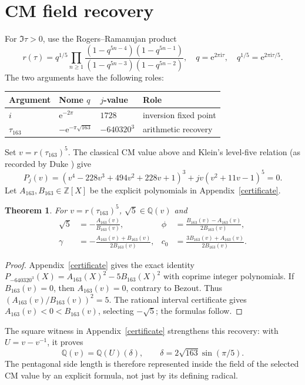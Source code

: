 \documentclass[11pt]{article}
\newtheorem{theorem}{Theorem}[section]\newtheorem{proposition}[theorem]{Proposition}\newtheorem{corollary}[theorem]{Corollary}
\newcommand{\Q}{\mathbb Q}\newcommand{\R}{\mathbb R}\newcommand{\ii}{\mathrm i}\newcommand{\e}{\mathrm e}\newcommand{\Fcal}{\mathcal F}\newcommand{\Tcal}{\mathcal T}
\begin{document}
\section{CM field recovery}\label{sec:cm}
For $\Im\tau>0$, use the Rogers--Ramanujan product
\cite[Eq.~(4.1)]{Duke}
\begin{equation}\label{rr}
r(\tau)=q^{1/5}\prod_{n\ge1}\frac{(1-q^{5n-4})(1-q^{5n-1})}{(1-q^{5n-3})(1-q^{5n-2})},
\quad q=\e^{2\pi\ii\tau},\quad q^{1/5}=\e^{2\pi\ii\tau/5}.
\end{equation}
The two arguments have the following roles:
\begin{center}
\begin{tabular}{@{}llll@{}}
\hline
Argument & Nome $q$ & $j$-value & Role\\ \hline
$i$ & $\e^{-2\pi}$ & $1728$ & inversion fixed point\\
$\tau_{163}$ & $-\e^{-\pi\sqrt{163}}$ & $-640320^3$ & arithmetic recovery\\ \hline
\end{tabular}
\end{center}
Set $v=r(\tau_{163})^5$. The classical CM value above and Klein's
level-five relation (as recorded by Duke \cite[Eq.~(2.5)]{Duke}) give
\begin{equation}\label{klein}
P_j(v)=(v^4-228v^3+494v^2+228v+1)^3+jv(v^2+11v-1)^5=0.
\end{equation}
Let $A_{163},B_{163}\in\mathbb Z[X]$ be the explicit polynomials
in Appendix~\ref{certificate}.
\begin{theorem}\label{recovery}
For $v=r(\tau_{163})^5$, $\sqrt5\in\Q(v)$ and
\[
\begin{aligned}
\sqrt5&=-\frac{A_{163}(v)}{B_{163}(v)},&
\phi&=\frac{B_{163}(v)-A_{163}(v)}{2B_{163}(v)},\\
\gamma&=-\frac{A_{163}(v)+B_{163}(v)}{2B_{163}(v)},&
c_0&=\frac{3B_{163}(v)+A_{163}(v)}{2B_{163}(v)}.
\end{aligned}
\]
\end{theorem}
\begin{proof}
Appendix~\ref{certificate} gives the exact identity
$P_{-640320^3}(X)=A_{163}(X)^2-5B_{163}(X)^2$ with coprime integer
polynomials.  If $B_{163}(v)=0$, then $A_{163}(v)=0$, contrary to Bezout.
Thus $(A_{163}(v)/B_{163}(v))^2=5$.  The rational interval certificate gives
$A_{163}(v)<0<B_{163}(v)$, selecting $-\sqrt5$; the formulas follow.
\end{proof}
The square witness in Appendix~\ref{certificate} strengthens this recovery:
with $U=v-v^{-1}$, it proves
\[
\Q(v)=\Q(U)(\delta),\qquad \delta=2\sqrt{163}\sin(\pi/5).
\]
The pentagonal side length is therefore represented inside the field of the
selected CM value by an explicit formula, not just by its defining radical.
\end{document}

